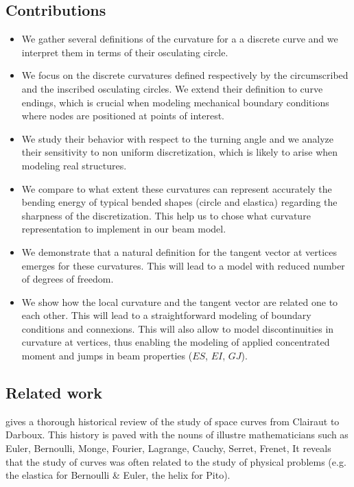 \subsection{Contributions}
\begin{itemize}
\item We gather several definitions of the curvature for a a discrete curve and we interpret them in terms of their osculating circle.
\item We focus on the discrete curvatures defined respectively by the circumscribed and the inscribed osculating circles. We extend their definition to curve endings, which is crucial when modeling mechanical boundary conditions where nodes are positioned at points of interest.
\item  We study their behavior with respect to the turning angle and we analyze their sensitivity to non uniform discretization, which is likely to arise when modeling real structures.
\item We compare to what extent these curvatures can represent accurately the bending energy of typical bended shapes (circle and elastica) regarding the sharpness of the discretization. This help us to chose what curvature representation to implement in our beam model.
\item We demonstrate that a natural definition for the tangent vector at vertices emerges for these curvatures. This will lead to a model with reduced number of degrees of freedom.
\item We show how the local curvature and the tangent vector are related one to each other. This will lead to a straightforward modeling of boundary conditions and connexions. This will also allow to model discontinuities in curvature at vertices, thus enabling the modeling of applied concentrated moment and jumps in beam properties ($ES$, $EI$, $GJ$).
\end{itemize}


\subsection{Related work}

 gives a thorough historical review of the study of space curves from Clairaut to Darboux. This history is paved with the nouns of illustre mathematicians such as Euler, Bernoulli, Monge, Fourier, Lagrange, Cauchy, Serret, Frenet, \telp{} It reveals that the study of curves was often related to the study of physical problems (e.g. the elastica for Bernoulli \& Euler, the helix for Pito).

